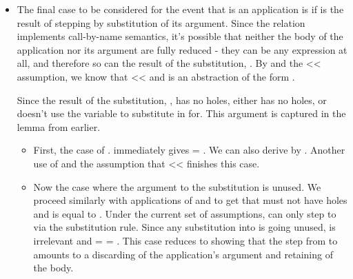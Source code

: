 \documentclass[12pt]{report}
\begin{document}
\begin{itemize}
\item  The final case to be considered for the event that
     is an application is if  is the result
        of  stepping by substitution of its argument.
        Since the  relation implements call-by-name
        semantics, it's possible that neither the body of the
        application nor its argument are fully reduced - they can be
        any expression at all, and therefore so can the result of the
        substitution, . By 
        and the  <<  assumption, we know
        that  <<  and
         is an abstraction of the form 
          .


        Since the result of the substitution, , has no
        holes, either  has no holes, or
         doesn't use the variable to substitute in
        for. This argument is captured in the
         lemma from earlier. 



\begin{itemize}

\item  First, the case of  .
     immediately gives
         = . We can also derive
          by
        . Another use of
         and the assumption
        that  <<  finishes this
        case.



\item  Now the case where the argument to the substitution is unused.
    We proceed similarly with applications of
         and
         to get that
         must not have holes and is equal to
        . Under the current set of assumptions,
         can only step to  via the
        substitution rule. Since any substitution into
         is going unused,  is
        irrelevant and  = 
        = . This case reduces to showing that the step
        from  to  amounts to a discarding
        of the application's argument and retaining of the body. 

\end{itemize}

\end{itemize}
\end{document}
